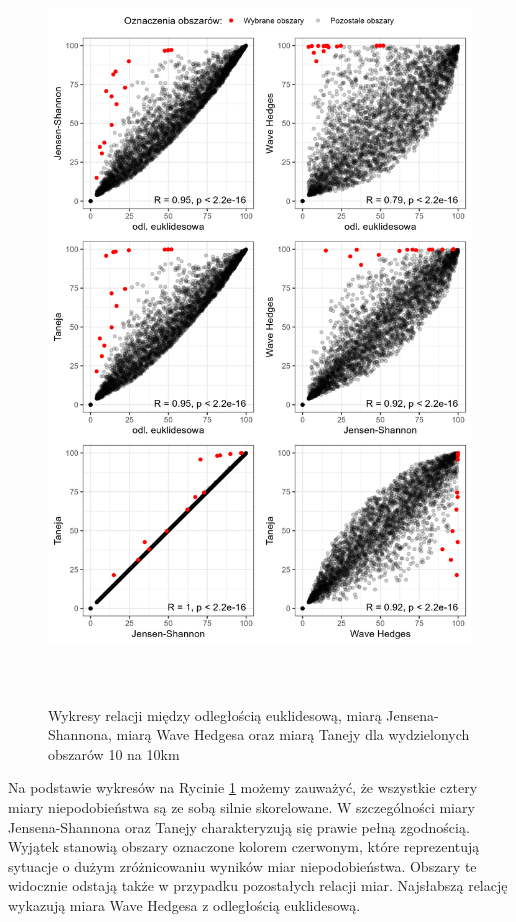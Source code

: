 \documentclass{amuthesis}
\begin{document}
\begin{figure}[t]

{\centering \includegraphics[width=5.20833in,height=7.8125in]{figures/relacje_miar1.png}

}

\caption{\label{fig-relacje_miar1}Wykresy relacji między odległością
euklidesową, miarą Jensena-Shannona, miarą Wave Hedgesa oraz miarą
Tanejy dla wydzielonych obszarów 10 na 10km}

\end{figure}

Na podstawie wykresów na Rycinie \ref{fig-relacje_miar1} możemy
zauważyć, że wszystkie cztery miary niepodobieństwa są ze sobą silnie
skorelowane. W szczególności miary Jensena-Shannona oraz Tanejy
charakteryzują się prawie pełną zgodnością. Wyjątek stanowią obszary
oznaczone kolorem czerwonym, które reprezentują sytuacje o dużym
zróżnicowaniu wyników miar niepodobieństwa. Obszary te widocznie odstają
także w przypadku pozostałych relacji miar. Najsłabszą relację wykazują
miara Wave Hedgesa z odległością euklidesową.
\end{document}
